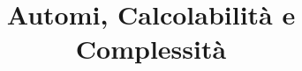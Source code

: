 



\title{Automi, Calcolabilit\`a e Complessit\`a}

\maketitle

\newpage

\tableofcontents
\newpage



\listoftables

\listoffigures


